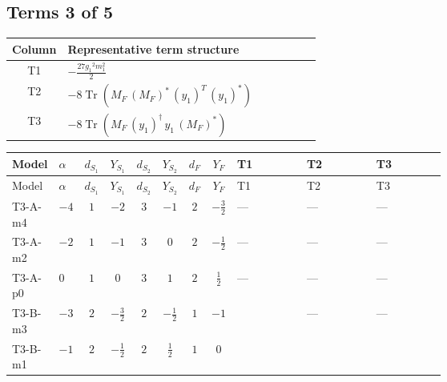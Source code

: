 \documentclass[8pt]{article}
\begin{document}
\begin{landscape}
\subsection*{Terms 3 of 5}
\begin{center}
\begin{tabular}{@{}c >{\raggedright\arraybackslash}p{0.82\linewidth}@{}}
\toprule
Column & Representative term structure \\
\midrule
T1 & \(\displaystyle -\frac{27 {g_1}^2 {m_1^2}}{2}\) \\
\midrule
T2 & \(\displaystyle -8 \operatorname{Tr}\!\left({M_F}\,\left({M_F}\right)^{*}\,\left({y_1}\right)^{T}\,\left({y_1}\right)^{*}\right)\) \\
\midrule
T3 & \(\displaystyle -8 \operatorname{Tr}\!\left({M_F}\,\left({y_1}\right)^{\dagger}\,{y_1}\,\left({M_F}\right)^{*}\right)\) \\
\midrule
\bottomrule
\end{tabular}
\end{center}
\smallskip
\tiny
\begin{longtable}{@{}llcccccc >{\raggedright\arraybackslash}p{0.21\linewidth} >{\raggedright\arraybackslash}p{0.21\linewidth} >{\raggedright\arraybackslash}p{0.21\linewidth}@{}}
\toprule
Model & $\alpha$ & $d_{S_1}$ & $Y_{S_1}$ & $d_{S_2}$ & $Y_{S_2}$ & $d_F$ & $Y_F$ & T1 & T2 & T3 \\
\midrule
\endfirsthead
\toprule
Model & $\alpha$ & $d_{S_1}$ & $Y_{S_1}$ & $d_{S_2}$ & $Y_{S_2}$ & $d_F$ & $Y_F$ & T1 & T2 & T3 \\
\midrule
\endhead
T3-A-m4 & $-4$ & $1$ & $-2$ & $3$ & $-1$ & $2$ & $-\frac{3}{2}$ & --- & --- & --- \\
\midrule
T3-A-m2 & $-2$ & $1$ & $-1$ & $3$ & $0$ & $2$ & $-\frac{1}{2}$ & --- & --- & --- \\
\midrule
T3-A-p0 & $0$ & $1$ & $0$ & $3$ & $1$ & $2$ & $\frac{1}{2}$ & --- & --- & --- \\
\midrule
T3-B-m3 & $-3$ & $2$ & $-\frac{3}{2}$ & $2$ & $-\frac{1}{2}$ & $1$ & $-1$ & \scriptsize\adjustbox{max width=\linewidth}{$\begin{gathered} -\frac{27 {g_1}^2 {m_1^2}}{2}\end{gathered}$} & --- & --- \\
\midrule
T3-B-m1 & $-1$ & $2$ & $-\frac{1}{2}$ & $2$ & $\frac{1}{2}$ & $1$ & $0$ & \scriptsize\adjustbox{max width=\linewidth}{$\begin{gathered} -\frac{3 {g_1}^2 {m_1^2}}{2}\end{gathered}$} & \scriptsize\adjustbox{max width=\linewidth}{$\begin{gathered} -8 \operatorname{Tr}\!\left({M_F}\,\left({M_F}\right)^{*}\,\left({y_1}\right)^{T}\,\left({y_1}\right)^{*}\right)\end{gathered}$} & \scriptsize\adjustbox{max width=\linewidth}{$\begin{gathered} -8 \operatorname{Tr}\!\left({M_F}\,\left({y_1}\right)^{\dagger}\,{y_1}\,\left({M_F}\right)^{*}\right)\end{gathered}$} \\

\end{longtable}
\end{landscape}
\end{document}
